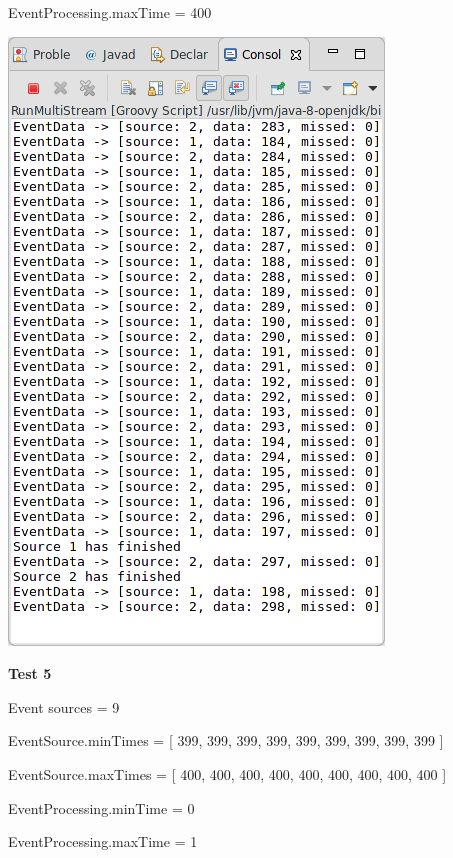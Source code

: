 EventProcessing.maxTime = 400

\includegraphics[width=\textwidth/2]{img/screenshots/9-2-3.png}

\textbf{Test 5}

Event sources = 9

EventSource.minTimes = [ 399, 399, 399, 399, 399, 399, 399, 399, 399 ]

EventSource.maxTimes = [ 400, 400, 400, 400, 400, 400, 400, 400, 400 ]

EventProcessing.minTime = 0

EventProcessing.maxTime = 1

